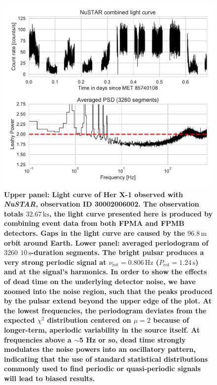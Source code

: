 \documentclass[12pt]{emulateapj}
\newcommand{\project}[1]{\textsl{#1}}
\newcommand{\nustar}{\project{NuSTAR}\xspace}
\begin{document}


\begin{figure}
\begin{center}
\includegraphics[width=\textwidth]{nustar_lc_psd.pdf}
\caption{\textbf{Upper panel: Light curve of Her X-1 observed with \nustar, observation ID 30002006002. The observation totals $32.67\,\mathrm{ks}$, the light curve presented here is produced by combining event data from both FPMA and FPMB detectors. Gaps in the light curve are caused by the $96.8 \,\mathrm{m}$ orbit around Earth. Lower panel: averaged periodogram of $3260$ $10\,\mathrm{s}$-duration segments. The bright pulsar produces a very strong periodic signal at $\nu_\mathrm{rot} = 0.806\,\mathrm{Hz}$ ($P_\mathrm{rot} = 1.24\,\mathrm{s}$) and at the signal's harmonics. In order to show the effects of dead time on the underlying detector noise, we have zoomed into the noise region, such that the peaks produced by the pulsar extend beyond the upper edge of the plot. At the lowest frequencies, the periodogram deviates from the expected $\chi^2$ distribution centered on $\mu = 2$ because of longer-term, aperiodic variability in the source itself. At frequencies above a $\sim$5 Hz or so, dead time strongly modulates the noise powers into an oscillatory pattern, indicating that the use of standard statistical distributions commonly used to find periodic or quasi-periodic signals will lead to biased results.
}}
\label{fig:herx1_lc}
\end{center}
\end{figure}
\end{document}
